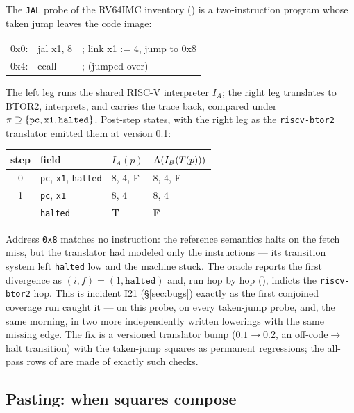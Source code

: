 \begin{genexample}
The \texttt{JAL} probe of the RV64IMC inventory
() is a two-instruction program whose taken jump
leaves the code image:
\begin{center}
\footnotesize\ttfamily
\begin{tabular}{@{}lll@{}}
0x0: & jal x1, 8 & ; link x1 := 4, jump to 0x8 \\
0x4: & ecall     & ; (jumped over) \\
\end{tabular}
\end{center}
The left leg runs the shared RISC-V interpreter $I_A$; the right leg
translates to BTOR2, interprets, and carries the trace back, compared
under $\pi \supseteq \{\texttt{pc}, \texttt{x1}, \texttt{halted}\}$.
Post-step states, with the right leg as the
\texttt{riscv-btor2} translator emitted them at version 0.1:
\begin{center}
\footnotesize
\begin{tabular}{@{}clll@{}}
\toprule
step & field & $I_A(p)$ & $\Lambda(I_B(T(p)))$ \\
\midrule
0 & \texttt{pc}, \texttt{x1}, \texttt{halted} & 8, 4, F & 8, 4, F \\
1 & \texttt{pc}, \texttt{x1} & 8, 4 & 8, 4 \\
  & \texttt{halted} & \textbf{T} & \textbf{F} \\
\bottomrule
\end{tabular}
\end{center}
Address \texttt{0x8} matches no instruction: the reference semantics
halts on the fetch miss, but the translator had modeled only the
instructions --- its transition system left \texttt{halted} low and the
machine stuck. The oracle reports the first divergence as
$(i, f) = (1, \texttt{halted})$ and, run hop by hop
(), indicts the \texttt{riscv-btor2} hop. This
is incident I21 (\S\ref{sec:bugs}) exactly as the first conjoined
coverage run caught it --- on this probe, on every taken-jump probe,
and, the same morning, in two more independently written lowerings
with the same missing edge. The fix is a versioned translator bump
($0.1 \to 0.2$, an off-code$\to$halt transition) with the taken-jump
squares as permanent regressions; the all-pass rows of
 are made of exactly such checks.
\end{genexample}

\subsection{Pasting: when squares compose}
\label{sec:pasting}

